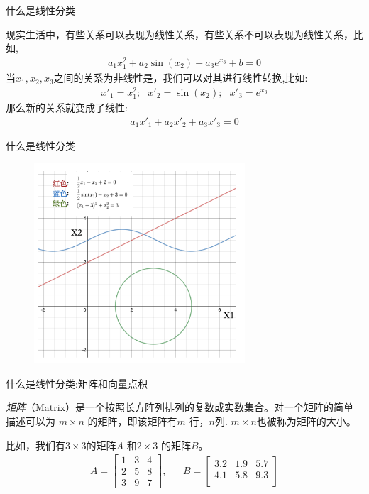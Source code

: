 \documentclass[handout]{ctexbeamer}
\begin{document}
\begin{frame}{什么是线性分类}
	\begin{example}
现实生活中，有些关系可以表现为线性关系，有些关系不可以表现为线性关系，比如,
\begin{align*}
	a_1 x_1^2 + a_2 \sin (x_2) + a_3 e^{x_3} + b  = 0 
\end{align*}	
当$x_1, x_2, x_3$之间的关系为非线性是，我们可以对其进行线性转换,比如:
\begin{align*}
	x'_1 = x_1^2; \ \ \ x'_2 = \sin (x_2); \ \ \ x'_3 = e^{x_3}
\end{align*}
那么新的关系就变成了线性: 
\begin{align*}
	a_1 x'_1 + a_2 x'_2 + a_3 x'_3 = 0 
\end{align*}
\end{example}
\end{frame}

\begin{frame}{什么是线性分类}
\begin{figure}[H]
	\centering
	\includegraphics[width=0.7\textwidth]{fig/C2C2linear}
\end{figure}	
\end{frame}

\begin{frame}{什么是线性分类:矩阵和向量点积}
\begin{definition}
	\textit{矩阵}（Matrix）是一个按照长方阵列排列的复数或实数集合。对一个矩阵的简单描述可以为 $m \times n$ 的矩阵，即该矩阵有$m$ 行，$n$列. $m \times n$也被称为矩阵的大小。
\end{definition}

\begin{example}
比如，我们有$3 \times 3 $的矩阵$A$ 和$2 \times 3$ 的矩阵$B$。
\begin{align*}
	 A = \begin{bmatrix}
	1 & 3 & 4 \\
	2 & 5 & 8 \\
	3 & 9 & 7
\end{bmatrix}, & & B = \begin{bmatrix}
	3.2 & 1.9 & 5.7 \\
	4.1 & 5.8 & 9.3 \\
\end{bmatrix}
\end{align*}	
\end{example}
\end{frame}
\end{document}
